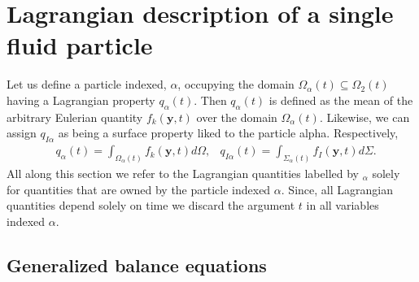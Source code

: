
\section{Lagrangian description of a single fluid particle}


Let us define a particle indexed, $\alpha$, occupying the domain $\Omega_\alpha(t) \subseteq \Omega_2(t)$ having a Lagrangian property $q_\alpha(t)$.
Then $q_\alpha(t)$ is defined as the mean of the arbitrary Eulerian quantity $f_k(\textbf{y},t)$ over the domain $\Omega_\alpha(t)$. 
Likewise, we can assign $q_{I\alpha}$ as being a surface property liked to the particle alpha.
Respectively, 
\begin{align*}
    &q_\alpha(t)
    = \int_{\Omega_\alpha(t)} f_k(\textbf{y},t) d\Omega,
    &q_{I\alpha}(t)
    = \int_{\Sigma_\alpha(t)} f_I(\textbf{y},t) d\Sigma.
    \label{eq:q_alpha}
\end{align*}
All along this section we refer to the Lagrangian quantities labelled by $_\alpha$ solely for quantities that are owned by the particle indexed $\alpha$.
Since, all Lagrangian quantities depend solely on time we discard the argument $t$ in all variables indexed $\alpha$.

\subsection{Generalized balance equations}


